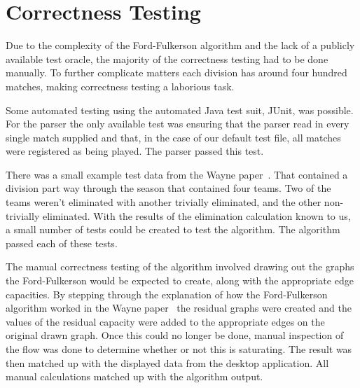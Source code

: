 \section{Correctness Testing}

Due to the complexity of the Ford-Fulkerson algorithm and the lack of a
publicly available test oracle, the majority of the correctness testing had to
be done manually. To further complicate matters each division has around four
hundred matches, making correctness testing a laborious task.

Some automated testing using the automated Java test suit, JUnit, was possible.
For the parser the only available test was ensuring that the parser read in
every single match supplied and that, in the case of our default test file,
all matches were registered as being played. The parser passed this test.

There was a small example test data from the Wayne paper~\cite{Wayne}. That
contained a division part way through the season that contained four teams.
Two of the teams weren't eliminated with another trivially eliminated, and the
other non-trivially eliminated. With the results of the elimination calculation
known to us, a small number of tests could be created to test the algorithm.
The algorithm passed each of these tests.

The manual correctness testing of the algorithm involved drawing out the graphs
the Ford-Fulkerson would be expected to create, along with the appropriate
edge capacities. By stepping through the explanation of how the Ford-Fulkerson
algorithm worked in the Wayne paper~\cite{Wayne} the residual graphs were
created and the values of the residual capacity were added to the appropriate
edges on the original drawn graph. Once this could no longer be done, manual
inspection of the flow was done to determine whether or not this is saturating.
The result was then matched up with the displayed data from the desktop
application. All manual calculations matched up with the algorithm output.
